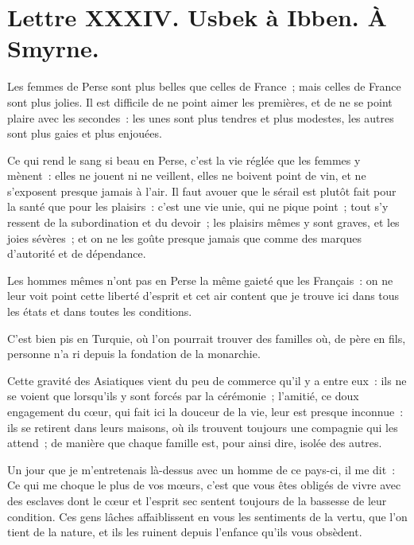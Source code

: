 \documentclass[french,twoside]{book} %
\newcommand{\dateline}[1]{\medskip{\RaggedLeft{#1}\par}\bigskip}
\begin{document}
\dateline{À Paris, le 25 de la lune de Zilcadé, 1713}
\section[{Lettre XXXIV. Usbek à Ibben. À Smyrne.}]{Lettre XXXIV. Usbek à Ibben. À Smyrne.}\renewcommand{\leftmark}{Lettre XXXIV. Usbek à Ibben. À Smyrne.}

\noindent Les femmes de Perse sont plus belles que celles de France ; mais celles de France sont plus jolies. Il est difficile de ne point aimer les premières, et de ne se point plaire avec les secondes : les unes sont plus tendres et plus modestes, les autres sont plus gaies et plus enjouées.\par
Ce qui rend le sang si beau en Perse, c’est la vie réglée que les femmes y mènent : elles ne jouent ni ne veillent, elles ne boivent point de vin, et ne s’exposent presque jamais à l’air. Il faut avouer que le sérail est plutôt fait pour la santé que pour les plaisirs : c’est une vie unie, qui ne pique point ; tout s’y ressent de la subordination et du devoir ; les plaisirs mêmes y sont graves, et les joies sévères ; et on ne les goûte presque jamais que comme des marques d’autorité et de dépendance.\par
Les hommes mêmes n’ont pas en Perse la même gaieté que les Français : on ne leur voit point cette liberté d’esprit et cet air content que je trouve ici dans tous les états et dans toutes les conditions.\par
C’est bien pis en Turquie, où l’on pourrait trouver des familles où, de père en fils, personne n’a ri depuis la fondation de la monarchie.\par
Cette gravité des Asiatiques vient du peu de commerce qu’il y a entre eux : ils ne se voient que lorsqu’ils y sont forcés par la cérémonie ; l’amitié, ce doux engagement du cœur, qui fait ici la douceur de la vie, leur est presque inconnue : ils se retirent dans leurs maisons, où ils trouvent toujours une compagnie qui les attend ; de manière que chaque famille est, pour ainsi dire, isolée des autres.\par
Un jour que je m’entretenais là-dessus avec un homme de ce pays-ci, il me dit : Ce qui me choque le plus de vos mœurs, c’est que vous êtes obligés de vivre avec des esclaves dont le cœur et l’esprit sec sentent toujours de la bassesse de leur condition. Ces gens lâches affaiblissent en vous les sentiments de la vertu, que l’on tient de la nature, et ils les ruinent depuis l’enfance qu’ils vous obsèdent.\par
\end{document}
